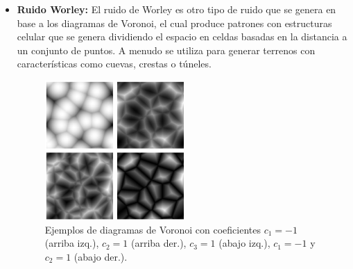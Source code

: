 \begin{itemize}
\begin{itemize}
                    \item \textbf{Ruido Worley:} El ruido de Worley es otro tipo de ruido que se genera en base a los diagramas de Voronoi, el cual produce patrones con estructuras celular que se genera dividiendo el espacio en celdas basadas en la distancia a un conjunto de puntos. A menudo se utiliza para generar terrenos con características como cuevas, crestas o túneles. \cite{worley-noise}
                    \begin{figure}[h]
                        \centering
                        \includegraphics[width=0.5\textwidth]{img/voronoi-diagrams.png}
                        \caption{Ejemplos de diagramas de Voronoi con coeficientes $c_1 = -1$ (arriba izq.), $c_2 = 1$ (arriba der.), $c_3 = 1$ (abajo izq.), $c_1 = -1$ y $c_2 = 1$ (abajo der.).}
                        \label{fig:voronoi}
                    \end{figure}


\end{itemize}
\end{itemize}
